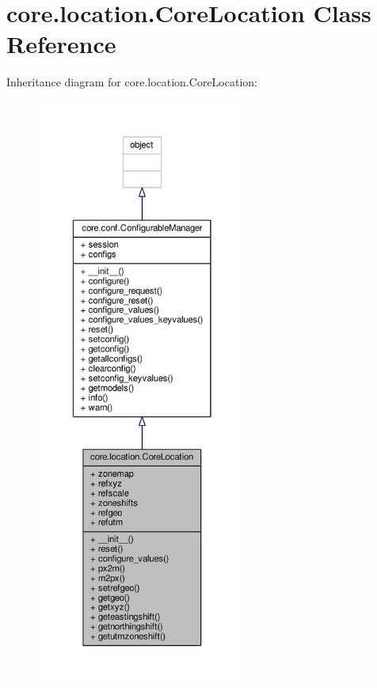 \hypertarget{classcore_1_1location_1_1_core_location}{\section{core.\+location.\+Core\+Location Class Reference}
\label{classcore_1_1location_1_1_core_location}
}


Inheritance diagram for core.\+location.\+Core\+Location\+:
\nopagebreak
\begin{figure}[H]
\begin{center}
\leavevmode
\includegraphics[height=550pt]{classcore_1_1location_1_1_core_location__inherit__graph}
\end{center}
\end{figure}


